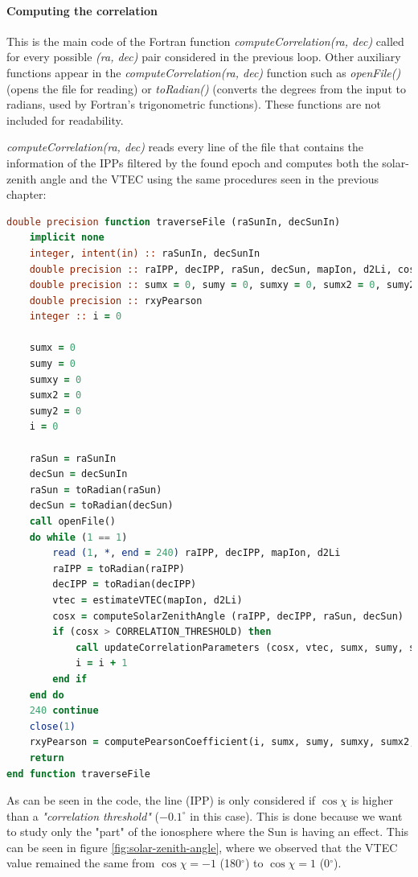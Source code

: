 \paragraph{Computing the correlation}

This is the main code of the Fortran function \textit{computeCorrelation(ra, dec)} called for every possible \textit{(ra, dec)} pair considered in the previous loop. Other auxiliary functions appear in the \textit{computeCorrelation(ra, dec)} function such as \textit{openFile()} (opens the file for reading) or \textit{toRadian()} (converts the degrees from the input to radians, used by Fortran's trigonometric functions). These functions are not included for readability.

\textit{computeCorrelation(ra, dec)} reads every line of the file that contains the information of the IPPs filtered by the found epoch and computes both the solar-zenith angle and the VTEC using the same procedures seen in the previous chapter:

\begin{minipage}{\linewidth}
\begin{lstlisting}[language=Fortran, caption=Correlation computation]
double precision function traverseFile (raSunIn, decSunIn)
	implicit none
	integer, intent(in) :: raSunIn, decSunIn
	double precision :: raIPP, decIPP, raSun, decSun, mapIon, d2Li, cosX, vtec
	double precision :: sumx = 0, sumy = 0, sumxy = 0, sumx2 = 0, sumy2 = 0
	double precision :: rxyPearson
	integer :: i = 0
	
	sumx = 0
	sumy = 0
	sumxy = 0
	sumx2 = 0
	sumy2 = 0
	i = 0
	
	raSun = raSunIn
	decSun = decSunIn
	raSun = toRadian(raSun)
	decSun = toRadian(decSun)
	call openFile()
	do while (1 == 1)
		read (1, *, end = 240) raIPP, decIPP, mapIon, d2Li
		raIPP = toRadian(raIPP)
		decIPP = toRadian(decIPP)
		vtec = estimateVTEC(mapIon, d2Li)
		cosx = computeSolarZenithAngle (raIPP, decIPP, raSun, decSun)
		if (cosx > CORRELATION_THRESHOLD) then
			call updateCorrelationParameters (cosx, vtec, sumx, sumy, sumxy, sumx2, sumy2)
			i = i + 1
		end if	
	end do
	240 continue
	close(1)
	rxyPearson = computePearsonCoefficient(i, sumx, sumy, sumxy, sumx2, sumy2)
	return
end function traverseFile
\end{lstlisting}
\end{minipage}

As can be seen in the code, the line (IPP) is only considered if $\cos\chi$ is higher than a \textit{"correlation threshold"} ($-0.1^{\circ}$ in this case). This is done because we want to study only the "part" of the ionosphere where the Sun is having an effect. This can be seen in figure \ref{fig:solar-zenith-angle}, where we observed that the VTEC value remained the same from $\cos\chi = -1$ (180$^{\circ}$) to $\cos\chi = 1$ (0$^{\circ}$).


